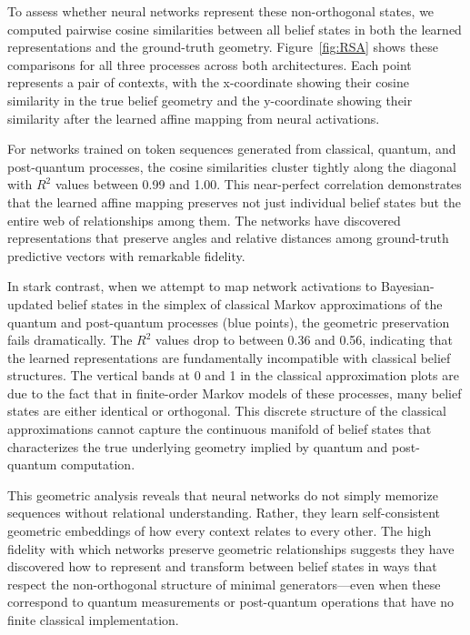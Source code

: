 \documentclass[prx,nofootinbib,onecolumn,showkeys,groupaddress,preprintnumbers,floatfix,
superscriptaddress]{revtex4-1}
\begin{document}

To assess whether neural networks represent these non-orthogonal states, we computed pairwise cosine similarities between all belief states in both the learned representations and the ground-truth geometry. Figure~\ref{fig:RSA} shows these comparisons for all three processes across both architectures. Each point represents a pair of contexts, with the x-coordinate showing their cosine similarity in the true belief geometry and the y-coordinate showing their similarity after the learned affine mapping from neural activations.

For networks trained on 
token sequences
generated from classical, quantum, and post-quantum processes, the cosine similarities cluster tightly along the diagonal with $R^2$ values between 0.99 and 1.00. This near-perfect correlation demonstrates that the learned affine mapping preserves not just individual belief states but the entire web of relationships among them. The networks have discovered 
representations %
that preserve angles and relative distances 
among ground-truth predictive vectors
with remarkable fidelity.

In stark contrast, when we attempt to map network activations to 
Bayesian-updated belief states in the simplex of
classical Markov approximations of the quantum and post-quantum processes (blue points), the geometric preservation fails dramatically. The $R^2$ values drop to between 0.36 and 0.56, indicating that the learned representations are fundamentally incompatible with classical belief structures. The vertical bands at 0 and 1 in the classical approximation plots are due to the fact that in finite-order Markov models of these processes, many belief states are either identical or orthogonal. This discrete structure 
of the classical approximations
cannot capture the continuous manifold of belief states that characterizes the true underlying geometry implied by quantum and post-quantum computation.

This geometric analysis reveals that neural networks do not simply memorize sequences without relational understanding.
Rather, they learn self-consistent geometric embeddings of how every context relates to every other.
The high fidelity with which networks preserve geometric relationships suggests they have discovered how to represent and transform between belief states in ways that respect the non-orthogonal structure of minimal generators—even when these correspond to quantum measurements or post-quantum operations that have no finite classical implementation.
\end{document}
